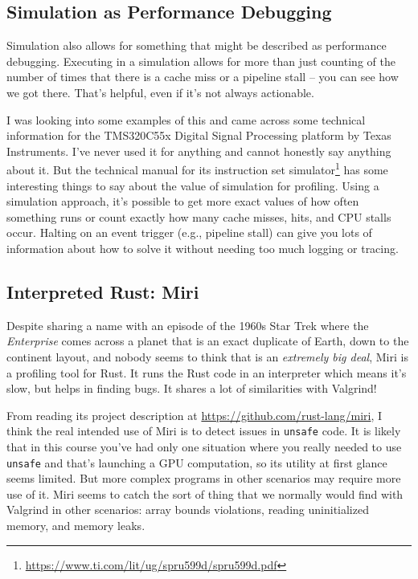 \subsection*{Simulation as Performance Debugging}
Simulation also allows for something that might be described as performance debugging. Executing in a simulation allows for more than just counting of the number of times that there is a cache miss or a pipeline stall -- you can see how we got there. That's helpful, even if it's not always actionable.

I was looking into some examples of this and came across some technical information for the TMS320C55x Digital Signal Processing platform by Texas Instruments. I've never used it for anything and cannot honestly say anything about it. But the technical manual for its instruction set simulator\footnote{\url{https://www.ti.com/lit/ug/spru599d/spru599d.pdf}} has some interesting things to say about the value of simulation for profiling. Using a simulation approach, it's possible to get more exact values of how often something runs or count exactly how many cache misses, hits, and CPU stalls occur. Halting on an event trigger (e.g., pipeline stall) can give you lots of information about how to solve it without needing too much logging or tracing.

\subsection*{Interpreted Rust: Miri}
Despite sharing a name with an episode of the 1960s Star Trek where the \textit{Enterprise} comes across a planet that is an exact duplicate of Earth, down to the continent layout, and nobody seems to think that is an \textit{extremely big deal}, Miri is a profiling tool for Rust. It runs the Rust code in an interpreter which means it's slow, but helps in finding bugs. It shares a lot of similarities with Valgrind!

From reading its project description at \url{https://github.com/rust-lang/miri}, I think the real intended use of Miri is to detect issues in \texttt{unsafe} code. It is likely that in this course you've had only one situation where you really needed to use \texttt{unsafe} and that's launching a GPU computation, so its utility at first glance seems limited. But more complex programs in other scenarios may require more use of it. Miri seems to catch the sort of thing that we normally would find with Valgrind in other scenarios: array bounds violations, reading uninitialized memory, and memory leaks.

